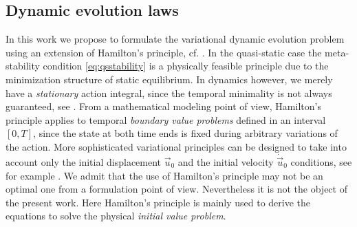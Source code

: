 \subsection{Dynamic evolution laws}
In this work we propose to formulate the variational dynamic evolution problem using an extension of Hamilton's principle, cf. \cite{Hamilton:1834}. In the quasi-static case the meta-stability condition \eqref{eq:qsstability} is a physically feasible principle due to the minimization structure of static equilibrium. In dynamics however, we merely have a \emph{stationary} action integral, since the temporal minimality is not always guaranteed, see \cite{Gray:2007aa}. From a mathematical modeling point of view, Hamilton's principle applies to temporal \emph{boundary value problems} defined in an interval $[0,T]$, since the state at both time ends is fixed during arbitrary variations of the action. More sophisticated variational principles can be designed to take into account only the initial displacement $\vec{u}_0$ and the initial velocity $\dot{\vec{u}}_0$ conditions, see for example \cite{Gurtin:1964aa}. We admit that the use of Hamilton's principle may not be an optimal one from a formulation point of view. Nevertheless it is not the object of the present work. Here Hamilton's principle is mainly used to derive the equations to solve the physical \emph{initial value problem}.

